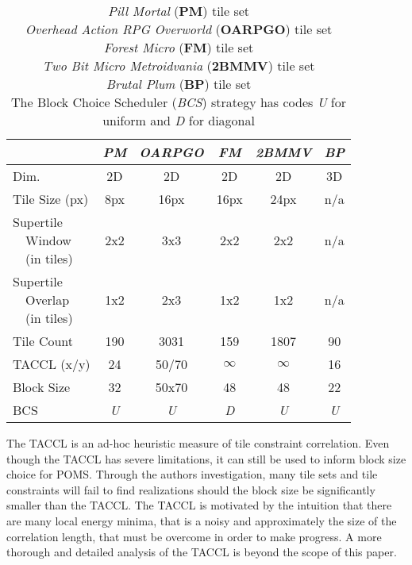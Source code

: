 \begin{table}[h]
  \centering
  \begin{tabular}[t]{l|ccccc}
    & \textit{PM} & \textit{OARPGO} & \textit{FM} & \textit{2BMMV} & \textit{BP} \\
    \hline
      Dim. & 2D & 2D & 2D & 2D & 3D \\
      Tile Size (px) & 8px & 16px & 16px & 24px & n/a \\
      \specialcell{Supertile \\ \ \ Window \\ \ \ (in tiles)}  & 2x2 & 3x3 & 2x2 & 2x2 & n/a \\
      \specialcell{Supertile \\ \ \ Overlap \\ \ \ (in tiles)}  & 1x2 & 2x3 & 1x2 & 1x2 & n/a \\
      Tile Count & 190 & 3031 & 159 & 1807 & 90 \\
      TACCL (x/y) & 24 & 50/70 & $\infty$ & $\infty$ & 16 \\
      Block Size & 32 & 50x70 & 48 & 48 & 22 \\
      BCS & \textit{U} & \textit{U} & \textit{D} & \textit{U} & \textit{U} \\
     \hline
  \end{tabular}
  \caption{\textit{Pill Mortal} (\textbf{PM}) tile set \\ \textit{Overhead Action RPG Overworld} (\textbf{OARPGO}) tile set \cite{LUNARSIGNALS_oarpgo} \\ \textit{Forest Micro} (\textbf{FM}) tile set \cite{ThKaspar_micro} \\ \textit{Two Bit Micro Metroidvania} (\textbf{2BMMV}) tile set \cite{0x72_2bmmv} \\ \textit{Brutal Plum} (\textbf{BP}) tile set \\ The Block Choice Scheduler (\textit{BCS}) strategy has codes \textit{U} for uniform and \textit{D} for diagonal}
  \label{table:tilesets}
\end{table}

The TACCL is an ad-hoc heuristic measure of tile constraint correlation.
Even though the TACCL has severe limitations, it can still be used to inform block size choice for POMS.
Through the authors investigation, many tile sets and tile constraints will fail to find realizations should the block size be significantly
smaller than the TACCL.
The TACCL is motivated by the intuition that there are many local energy minima, that is a noisy and approximately the size of the correlation length, that must
be overcome in order to make progress.
A more thorough and detailed analysis of the TACCL is beyond the scope of this paper.

